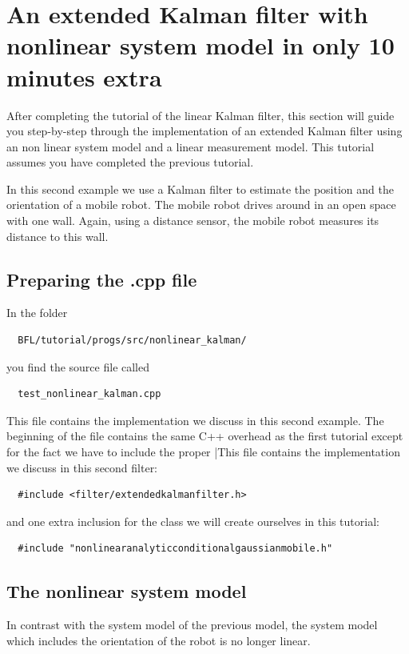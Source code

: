 \documentclass[a4paper,10pt]{report}
\begin{document}

\pagebreak
\section{An extended Kalman filter with nonlinear system model in only
  10 minutes extra}
After completing the tutorial of the linear Kalman filter, this
section will guide you step-by-step through the implementation of an
extended Kalman filter using an non linear system model and a linear
measurement model. This tutorial assumes you have completed the
previous tutorial.

In this second example we use a Kalman filter to estimate the position
and the orientation of a mobile robot. The mobile robot drives around
in an open space with one wall. Again, using a distance sensor, the
mobile robot measures its distance to this wall.

\subsection{Preparing the .cpp file}
In the folder 
\begin{verbatim}
  BFL/tutorial/progs/src/nonlinear_kalman/
\end{verbatim}
you find the source file called 
\begin{verbatim}
  test_nonlinear_kalman.cpp
\end{verbatim}
This file contains the implementation we discuss in this second
example. The beginning of the file contains the same C++ overhead as
the first tutorial except for the fact we have to include the proper
|This file contains the implementation we discuss in this second
filter:
\begin{verbatim}
  #include <filter/extendedkalmanfilter.h>
\end{verbatim}
and one extra inclusion for the class we will create ourselves in this
tutorial:
\begin{verbatim}
  #include "nonlinearanalyticconditionalgaussianmobile.h"
\end{verbatim}



\subsection{The nonlinear system model}
In contrast with the system model of the previous model, the system
model which includes the orientation of the robot is no longer
linear.
\end{document}
